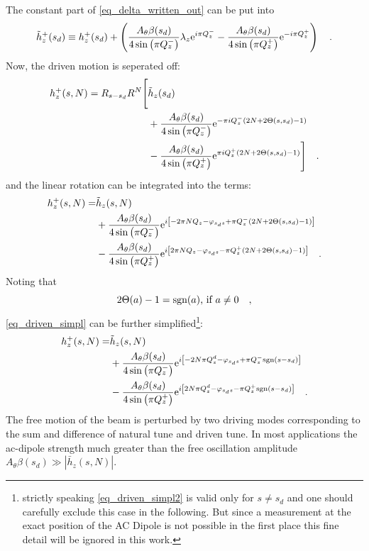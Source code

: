 %
The constant part of \eqref{eq_delta_written_out} can be put into 
%
\begin{equation}
    \tilde{h}_z^+(s_d) \equiv h_z^+(s_d) + 
    \left(
    \frac{A_\theta\beta(s_d)}{4\sin\left( \pi Q_z^-\right)}\lambda_z \text{e}^{i \pi Q_z^-}
    -\frac{A_\theta\beta(s_d)}{4\sin\left( \pi Q_z^+\right)} \text{e}^{-i\pi Q_z^+}
    \right)
    \quad .
\end{equation}
%
Now, the driven motion is seperated off:
%
\begin{align}
    h_z^+(s, N) = R_{s-s_d}R^N 
    \Bigg[&\tilde{h}_z(s_d) 
    \notag \\
        &+ \frac{A_\theta\beta(s_d)}{4\sin\left( \pi Q_z^-\right)} \text{e}^{-\pi i Q_z^-(2N+2\Theta(s,s_d)-1)} 
         \notag \\
        &- \frac{A_\theta\beta(s_d)}{4\sin\left( \pi Q_z^+\right)} \text{e}^{\pi i Q_z^+(2N+2\Theta(s,s_d) -1)}
    \Bigg]
    \quad .
    \label{eq_driven_simpl_R}
\end{align}
%
and the linear rotation can be integrated into the terms:
%
\begin{align}
    h_z^+(s, N) =
        &\tilde{h}_z(s, N) \notag \\
        &+\frac{A_\theta\beta(s_d)}{4\sin\left( \pi Q_z^-\right)}
        \text{e}^{i\left[-2\pi NQ_{z} - \varphi_{s_ds} + \pi Q_z^-(2N+2\Theta(s,s_d)-1)\right]}
        \notag\\
        &-\frac{A_\theta\beta(s_d)}{4\sin\left( \pi Q_z^+\right)}
        \text{e}^{i\left[2\pi NQ_{z} - \varphi_{s_ds}- \pi Q_z^+(2N + 2\Theta(s,s_d) -1)\right]}
    \quad .
    \label{eq_driven_simpl}
\end{align}
%
Noting that
%
\begin{equation}
  2\Theta(a) - 1 = \text{sgn}(a) \text{, if } a \neq 0
    \quad ,
\end{equation}
%
\eqref{eq_driven_simpl} can be further simplified\footnote{
    strictly speaking \eqref{eq_driven_simpl2} is valid only for $s\neq s_d$ and one should carefully exclude this case
    in the following. But since a measurement at the exact position of the AC Dipole is not possible in the first place
    this fine detail will be ignored in this work.
    }:
%
\begin{align}
    h_z^+(s, N) =
        &\tilde{h}_z(s, N) \notag \\
        &+ \frac{A_\theta\beta(s_d)}{4\sin\left( \pi Q_z^-\right)}
        \text{e}^{i\left[-2N\pi Q^{d}_{z} - \varphi_{s_ds} + \pi Q_z^-\text{sgn}(s-s_d)\right]} 
        \notag \\
        &- \frac{A_\theta\beta(s_d)}{4\sin\left( \pi Q_z^+\right)}
        \text{e}^{i\left[2N\pi Q^{d}_{z} - \varphi_{s_ds} - \pi Q_z^+\text{sgn}(s-s_d)\right]} 
    \quad .
    \label{eq_driven_simpl2}
\end{align}
%
The free motion of the beam is perturbed by two driving modes corresponding to the sum and difference
of natural tune and driven tune. In most applications the ac-dipole strength much greater than the free 
oscillation amplitude $A_\theta\beta(s_d) \gg |\bar{h}_z(s,N)|$.


